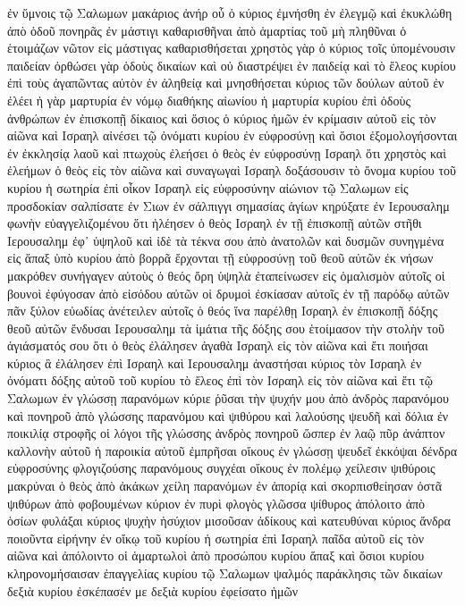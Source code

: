 ἐν ὕμνοις τῷ Σαλωμων
μακάριος ἀνήρ οὗ ὁ κύριος ἐμνήσθη ἐν ἐλεγμῷ καὶ ἐκυκλώθη ἀπὸ ὁδοῦ πονηρᾶς ἐν μάστιγι καθαρισθῆναι ἀπὸ ἁμαρτίας τοῦ μὴ πληθῦναι
ὁ ἑτοιμάζων νῶτον εἰς μάστιγας καθαρισθήσεται χρηστὸς γὰρ ὁ κύριος τοῖς ὑπομένουσιν παιδείαν
ὀρθώσει γὰρ ὁδοὺς δικαίων καὶ οὐ διαστρέψει ἐν παιδείᾳ καὶ τὸ ἔλεος κυρίου ἐπὶ τοὺς ἀγαπῶντας αὐτὸν ἐν ἀληθείᾳ
καὶ μνησθήσεται κύριος τῶν δούλων αὐτοῦ ἐν ἐλέει ἡ γὰρ μαρτυρία ἐν νόμῳ διαθήκης αἰωνίου ἡ μαρτυρία κυρίου ἐπὶ ὁδοὺς ἀνθρώπων ἐν ἐπισκοπῇ
δίκαιος καὶ ὅσιος ὁ κύριος ἡμῶν ἐν κρίμασιν αὐτοῦ εἰς τὸν αἰῶνα καὶ Ισραηλ αἰνέσει τῷ ὀνόματι κυρίου ἐν εὐφροσύνῃ
καὶ ὅσιοι ἐξομολογήσονται ἐν ἐκκλησίᾳ λαοῦ καὶ πτωχοὺς ἐλεήσει ὁ θεὸς ἐν εὐφροσύνῃ Ισραηλ
ὅτι χρηστὸς καὶ ἐλεήμων ὁ θεὸς εἰς τὸν αἰῶνα καὶ συναγωγαὶ Ισραηλ δοξάσουσιν τὸ ὄνομα κυρίου
τοῦ κυρίου ἡ σωτηρία ἐπὶ οἶκον Ισραηλ εἰς εὐφροσύνην αἰώνιον
τῷ Σαλωμων εἰς προσδοκίαν
σαλπίσατε ἐν Σιων ἐν σάλπιγγι σημασίας ἁγίων κηρύξατε ἐν Ιερουσαλημ φωνὴν εὐαγγελιζομένου ὅτι ἠλέησεν ὁ θεὸς Ισραηλ ἐν τῇ ἐπισκοπῇ αὐτῶν
στῆθι Ιερουσαλημ ἐφ᾽ ὑψηλοῦ καὶ ἰδὲ τὰ τέκνα σου ἀπὸ ἀνατολῶν καὶ δυσμῶν συνηγμένα εἰς ἅπαξ ὑπὸ κυρίου
ἀπὸ βορρᾶ ἔρχονται τῇ εὐφροσύνῃ τοῦ θεοῦ αὐτῶν ἐκ νήσων μακρόθεν συνήγαγεν αὐτοὺς ὁ θεός
ὄρη ὑψηλὰ ἐταπείνωσεν εἰς ὁμαλισμὸν αὐτοῖς οἱ βουνοὶ ἐφύγοσαν ἀπὸ εἰσόδου αὐτῶν
οἱ δρυμοὶ ἐσκίασαν αὐτοῖς ἐν τῇ παρόδῳ αὐτῶν πᾶν ξύλον εὐωδίας ἀνέτειλεν αὐτοῖς ὁ θεός
ἵνα παρέλθῃ Ισραηλ ἐν ἐπισκοπῇ δόξης θεοῦ αὐτῶν
ἔνδυσαι Ιερουσαλημ τὰ ἱμάτια τῆς δόξης σου ἑτοίμασον τὴν στολὴν τοῦ ἁγιάσματός σου ὅτι ὁ θεὸς ἐλάλησεν ἀγαθὰ Ισραηλ εἰς τὸν αἰῶνα καὶ ἔτι
ποιήσαι κύριος ἃ ἐλάλησεν ἐπὶ Ισραηλ καὶ Ιερουσαλημ ἀναστήσαι κύριος τὸν Ισραηλ ἐν ὀνόματι δόξης αὐτοῦ
τοῦ κυρίου τὸ ἔλεος ἐπὶ τὸν Ισραηλ εἰς τὸν αἰῶνα καὶ ἔτι
τῷ Σαλωμων ἐν γλώσσῃ παρανόμων
κύριε ῥῦσαι τὴν ψυχήν μου ἀπὸ ἀνδρὸς παρανόμου καὶ πονηροῦ ἀπὸ γλώσσης παρανόμου καὶ ψιθύρου καὶ λαλούσης ψευδῆ καὶ δόλια
ἐν ποικιλίᾳ στροφῆς οἱ λόγοι τῆς γλώσσης ἀνδρὸς πονηροῦ ὥσπερ ἐν λαῷ πῦρ ἀνάπτον καλλονὴν αὐτοῦ
ἡ παροικία αὐτοῦ ἐμπρῆσαι οἴκους ἐν γλώσσῃ ψευδεῖ ἐκκόψαι δένδρα εὐφροσύνης φλογιζούσης παρανόμους συγχέαι οἴκους ἐν πολέμῳ χείλεσιν ψιθύροις
μακρύναι ὁ θεὸς ἀπὸ ἀκάκων χείλη παρανόμων ἐν ἀπορίᾳ καὶ σκορπισθείησαν ὀστᾶ ψιθύρων ἀπὸ φοβουμένων κύριον ἐν πυρὶ φλογὸς γλῶσσα ψίθυρος ἀπόλοιτο ἀπὸ ὁσίων
φυλάξαι κύριος ψυχὴν ἡσύχιον μισοῦσαν ἀδίκους καὶ κατευθύναι κύριος ἄνδρα ποιοῦντα εἰρήνην ἐν οἴκῳ
τοῦ κυρίου ἡ σωτηρία ἐπὶ Ισραηλ παῖδα αὐτοῦ εἰς τὸν αἰῶνα καὶ ἀπόλοιντο οἱ ἁμαρτωλοὶ ἀπὸ προσώπου κυρίου ἅπαξ καὶ ὅσιοι κυρίου κληρονομήσαισαν ἐπαγγελίας κυρίου
τῷ Σαλωμων ψαλμός παράκλησις τῶν δικαίων
δεξιὰ κυρίου ἐσκέπασέν με δεξιὰ κυρίου ἐφείσατο ἡμῶν
